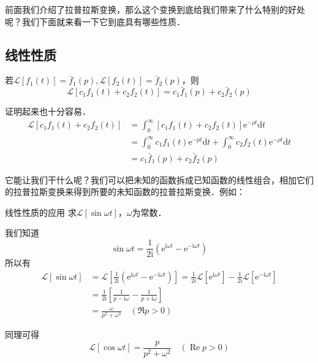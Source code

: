 

前面我们介绍了拉普拉斯变换，那么这个变换到底给我们带来了什么特别的好处呢？我们下面就来看一下它到底具有哪些性质．

\subsection{线性性质}


若$\mathscr L[f_1(t)] = \bar f_1(p),\mathscr L[f_2(t)] = \bar f_2(p)$，则
\begin{equation}
\mathscr L[c_1f_1(t)+c_2f_2(t)] = c_1\bar f_1(p) + c_2\bar f_2(p)
\end{equation}

证明起来也十分容易．
\begin{equation}
\begin{aligned} \mathscr L[c_{1} f_{1}(t)+c_{2} f_{2}(t)] & = \int_{0}^{\infty}\left[c_{1} f_{1}(t)+c_{2} f_{2}(t)\right] \mathrm{e}^{-\rho t} \mathrm{d} t \\ &=\int_{0}^{\infty} c_{1} f_{1}(t) \mathrm{e}^{-p t} \mathrm{d} t+\int_{0}^{\infty} c_{2} f_{2}(t) \mathrm{e}^{-\rho t} \mathrm{d} t \\ &=c_{1} \bar{f}_{1}(p)+c_{2} \bar{f}_{2}(p) \end{aligned}
\end{equation}

它能让我们干什么呢？我们可以把未知的函数拆成已知函数的线性组合，相加它们的拉普拉斯变换来得到所要的未知函数的拉普拉斯变换．例如：
\begin{example}{线性性质的应用}
求$\mathscr L[\sin \omega t]$，$\omega$为常数．

我们知道
\begin{equation}
\sin \omega t=\frac{1}{2 \mathrm{i}}\left(\mathrm{e}^{\mathrm{i} \omega t}-\mathrm{e}^{-\mathrm{i} \omega t}\right)
\end{equation}
所以有
\begin{equation}
\begin{aligned} \mathscr{L}[\sin \omega t] &=\mathscr{L}\left[\frac{1}{2 \mathrm{i}}\left(\mathrm{e}^{\mathrm{i} \omega t}-\mathrm{e}^{-\mathrm{i} \omega t}\right)\right]=\frac{1}{2 \mathrm{i}} \mathscr{L}\left[\mathrm{e}^{\mathrm{i} \omega t}\right]-\frac{1}{2 \mathrm{i}}\mathscr{L}\left[\mathrm{e}^{-\mathrm{i} \omega t}\right] \\ &=\frac{1}{2 \mathrm{i}}\left[\frac{1}{p-\mathrm{i} \omega}-\frac{1}{p+\mathrm{i} \omega}\right] \\ &=\frac{\omega}{p^{2}+\omega^{2}} \quad(\Re p>0) \end{aligned}
\end{equation}

同理可得
\begin{equation}
\mathscr{L}[\cos \omega t]=\frac{p}{p^{2}+\omega^{2}} \quad(\operatorname{Re} p>0)
\end{equation}
\end{example}

